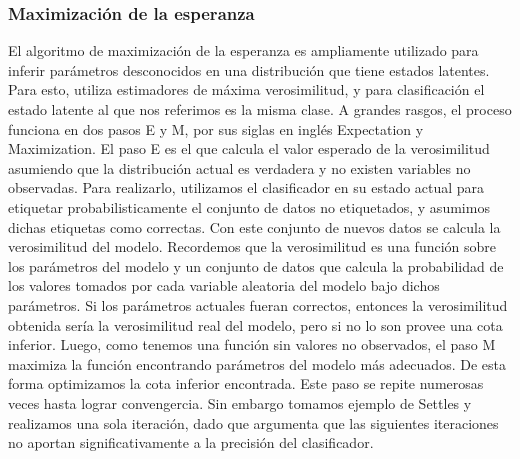 \subsubsection{Maximización de la esperanza}
El algoritmo de maximización de la esperanza es ampliamente utilizado para inferir parámetros desconocidos en una distribución que tiene estados latentes. Para esto, utiliza estimadores de máxima verosimilitud, y para clasificación el estado latente al que nos referimos es la misma clase. A grandes rasgos, el proceso funciona en dos pasos E y M, por sus siglas en inglés Expectation y Maximization.
El paso E es el que calcula el valor esperado de la verosimilitud asumiendo que la distribución actual es verdadera y no existen variables no observadas. Para realizarlo, utilizamos el clasificador en su estado actual para etiquetar probabilisticamente el conjunto de datos no etiquetados, y asumimos dichas etiquetas como correctas. Con este conjunto de nuevos datos se calcula la verosimilitud del modelo.
Recordemos que la verosimilitud es una función sobre los parámetros del modelo y un conjunto de datos que calcula la probabilidad de los valores tomados por cada variable aleatoria del modelo bajo dichos parámetros.
Si los parámetros actuales fueran correctos, entonces la verosimilitud obtenida sería la verosimilitud real del modelo, pero si no lo son provee una cota inferior. Luego, como tenemos una función sin valores no observados, el paso M maximiza la función encontrando parámetros del modelo más adecuados. De esta forma optimizamos la cota inferior encontrada.
Este paso se repite numerosas veces hasta lograr convengercia. Sin embargo tomamos ejemplo de Settles y realizamos una sola iteración, dado que argumenta que las siguientes iteraciones no aportan significativamente a la precisión del clasificador.





